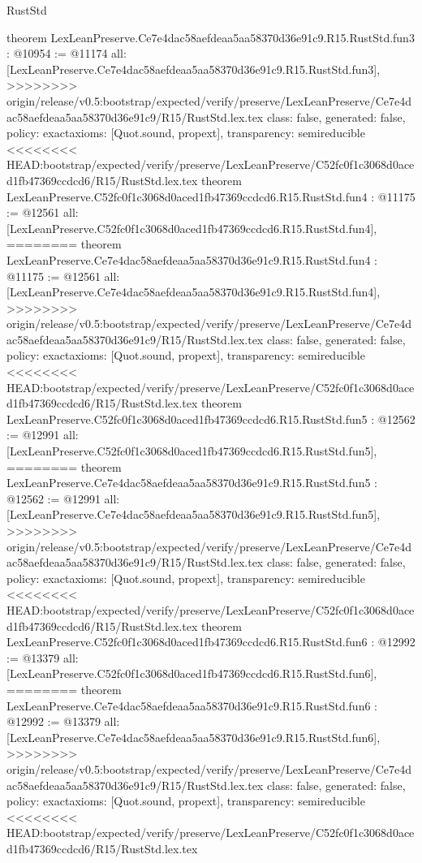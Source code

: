 \begin{lexlean}{RustStd}
\begin{coremodule}
{\begin{coremodule}
{{{{{{theorem LexLeanPreserve.Ce7e4dac58aefdeaa5aa58370d36e91c9.R15.RustStd.fun3 : @10954 := @11174 {
  all: [LexLeanPreserve.Ce7e4dac58aefdeaa5aa58370d36e91c9.R15.RustStd.fun3],
>>>>>>>> origin/release/v0.5:bootstrap/expected/verify/preserve/LexLeanPreserve/Ce7e4dac58aefdeaa5aa58370d36e91c9/R15/RustStd.lex.tex
  class: false,
  generated: false,
  policy: exact{axioms: [Quot.sound, propext]},
  transparency: semireducible
}
<<<<<<<< HEAD:bootstrap/expected/verify/preserve/LexLeanPreserve/C52fc0f1c3068d0aced1fb47369ccdcd6/R15/RustStd.lex.tex
theorem LexLeanPreserve.C52fc0f1c3068d0aced1fb47369ccdcd6.R15.RustStd.fun4 : @11175 := @12561 {
  all: [LexLeanPreserve.C52fc0f1c3068d0aced1fb47369ccdcd6.R15.RustStd.fun4],
========
theorem LexLeanPreserve.Ce7e4dac58aefdeaa5aa58370d36e91c9.R15.RustStd.fun4 : @11175 := @12561 {
  all: [LexLeanPreserve.Ce7e4dac58aefdeaa5aa58370d36e91c9.R15.RustStd.fun4],
>>>>>>>> origin/release/v0.5:bootstrap/expected/verify/preserve/LexLeanPreserve/Ce7e4dac58aefdeaa5aa58370d36e91c9/R15/RustStd.lex.tex
  class: false,
  generated: false,
  policy: exact{axioms: [Quot.sound, propext]},
  transparency: semireducible
}
<<<<<<<< HEAD:bootstrap/expected/verify/preserve/LexLeanPreserve/C52fc0f1c3068d0aced1fb47369ccdcd6/R15/RustStd.lex.tex
theorem LexLeanPreserve.C52fc0f1c3068d0aced1fb47369ccdcd6.R15.RustStd.fun5 : @12562 := @12991 {
  all: [LexLeanPreserve.C52fc0f1c3068d0aced1fb47369ccdcd6.R15.RustStd.fun5],
========
theorem LexLeanPreserve.Ce7e4dac58aefdeaa5aa58370d36e91c9.R15.RustStd.fun5 : @12562 := @12991 {
  all: [LexLeanPreserve.Ce7e4dac58aefdeaa5aa58370d36e91c9.R15.RustStd.fun5],
>>>>>>>> origin/release/v0.5:bootstrap/expected/verify/preserve/LexLeanPreserve/Ce7e4dac58aefdeaa5aa58370d36e91c9/R15/RustStd.lex.tex
  class: false,
  generated: false,
  policy: exact{axioms: [Quot.sound, propext]},
  transparency: semireducible
}
<<<<<<<< HEAD:bootstrap/expected/verify/preserve/LexLeanPreserve/C52fc0f1c3068d0aced1fb47369ccdcd6/R15/RustStd.lex.tex
theorem LexLeanPreserve.C52fc0f1c3068d0aced1fb47369ccdcd6.R15.RustStd.fun6 : @12992 := @13379 {
  all: [LexLeanPreserve.C52fc0f1c3068d0aced1fb47369ccdcd6.R15.RustStd.fun6],
========
theorem LexLeanPreserve.Ce7e4dac58aefdeaa5aa58370d36e91c9.R15.RustStd.fun6 : @12992 := @13379 {
  all: [LexLeanPreserve.Ce7e4dac58aefdeaa5aa58370d36e91c9.R15.RustStd.fun6],
>>>>>>>> origin/release/v0.5:bootstrap/expected/verify/preserve/LexLeanPreserve/Ce7e4dac58aefdeaa5aa58370d36e91c9/R15/RustStd.lex.tex
  class: false,
  generated: false,
  policy: exact{axioms: [Quot.sound, propext]},
  transparency: semireducible
}
<<<<<<<< HEAD:bootstrap/expected/verify/preserve/LexLeanPreserve/C52fc0f1c3068d0aced1fb47369ccdcd6/R15/RustStd.lex.tex
}}}}}}}}}
\end{coremodule}}
\end{coremodule}
\end{lexlean}
